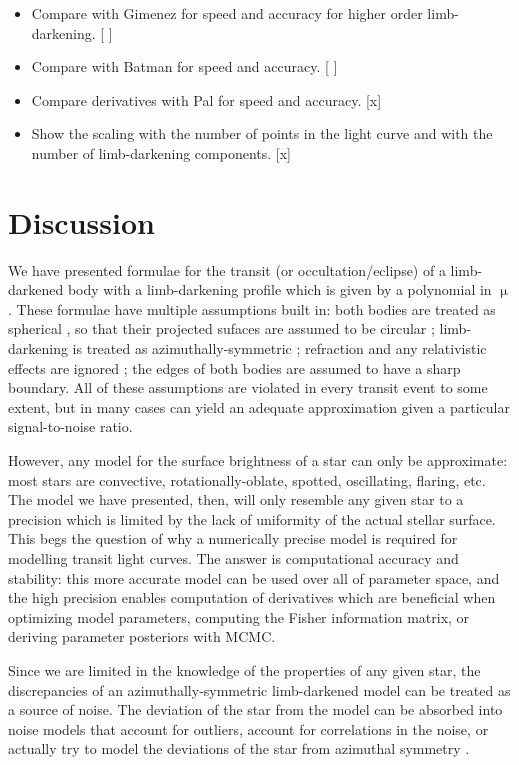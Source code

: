 \documentclass[modern]{aastex61}
\begin{document}
\begin{itemize}
\item Compare with Gimenez for speed and accuracy for higher order limb-darkening. [ ]
\item Compare with Batman for speed and accuracy. [ ]
\item Compare derivatives with Pal for speed and accuracy. [x]
\item Show the scaling with the number of points in the light curve
and with the number of limb-darkening components. [x]
\end{itemize}

\section{Discussion}

We have presented formulae for the transit (or occultation/eclipse) of a 
limb-darkened body with a limb-darkening profile which is given by a polynomial 
in $\upmu$.  These formulae have multiple assumptions built in:  both bodies 
are treated as spherical \citep{Seager2002,Hui2002}, so that their projected
sufaces are assumed to be circular \citep{Barnes2003,Barnes2004,Barnes2009b};  limb-
darkening is treated as azimuthally-symmetric \citep{Barnes2009a}; refraction 
and any relativistic effects are ignored \citep{Sidis2010}; the edges of both 
bodies are assumed to have a sharp boundary.
All of these assumptions are violated in every transit event to some extent, 
but in many cases can yield an adequate approximation given a particular
signal-to-noise ratio.

However, any model for the surface brightness of a star can only be approximate:  
most stars are convective, rotationally-oblate, spotted, oscillating, flaring, 
etc.  The model we have presented, then, will only resemble any given star to
a precision which is limited by the lack of uniformity of the actual stellar 
surface.  This begs the question of why a numerically precise model is required 
for modelling transit light curves.  The answer is computational accuracy
and stability: this more accurate model can be used over all of parameter space, 
and the high precision enables computation of derivatives which are beneficial 
when optimizing model parameters, computing the Fisher information matrix, or
deriving parameter posteriors with MCMC.

Since we are limited in the knowledge of the properties of any given star, 
the discrepancies of an azimuthally-symmetric limb-darkened model can be 
treated as a source of noise.
The deviation of the star from the model can be absorbed into noise models that 
account for outliers, account for correlations in the noise, or actually
try to model the deviations of the star from azimuthal symmetry 
\citep[e.g.][]{SanchisOjeda2011}.
\end{document}
